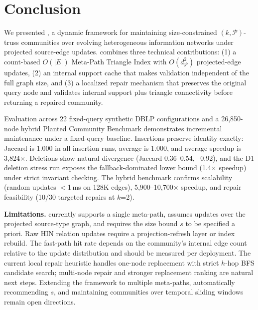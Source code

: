 \section{Conclusion}

We presented \DynaSCSH, a dynamic framework for maintaining size-constrained $(k,\mathcal{P})$-truss communities over evolving heterogeneous information networks under projected source-edge updates. \DynaSCSH combines three technical contributions: (1) a count-based $O(|E|)$ Meta-Path Triangle Index with $O(d_{\mathcal{P}}^2)$ projected-edge updates, (2) an internal support cache that makes validation independent of the full graph size, and (3) a localized repair mechanism that preserves the original query node and validates internal support plus triangle connectivity before returning a repaired community.

Evaluation across 22 fixed-query synthetic DBLP configurations and a 26,850-node hybrid Planted Community Benchmark demonstrates incremental maintenance under a fixed-query baseline. Insertions preserve identity exactly: Jaccard is 1.000 in all insertion runs, average \qratio is 1.000, and average speedup is 3,824$\times$. Deletions show natural divergence (Jaccard 0.36--0.54, --0.92), and the D1 deletion stress run exposes the fallback-dominated lower bound (1.4$\times$ speedup) under strict invariant checking. The hybrid benchmark confirms scalability (random updates $<$1\,ms on 128K edges), 5,900--10,700$\times$ speedup, and repair feasibility (10/30 targeted repairs at $k$=2).

\textbf{Limitations.} \DynaSCSH currently supports a single meta-path, assumes updates over the projected source-type graph, and requires the size bound $s$ to be specified a priori. Raw HIN relation updates require a projection-refresh layer or index rebuild. The fast-path hit rate depends on the community's internal edge count relative to the update distribution and should be measured per deployment. The current local repair heuristic handles one-node replacement with strict $h$-hop BFS candidate search; multi-node repair and stronger replacement ranking are natural next steps. Extending the framework to multiple meta-paths, automatically recommending $s$, and maintaining communities over temporal sliding windows remain open directions.
